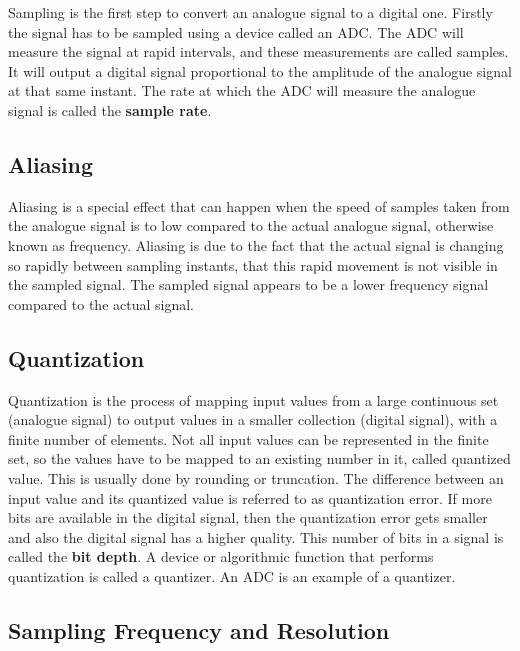 Sampling is the first step to convert an analogue signal to a digital one. Firstly the signal has to be sampled using a device called an \gls{ADC}. The \gls{ADC} will measure the signal at rapid intervals, and these measurements are called samples. It will output a digital signal proportional to the amplitude of the analogue signal at that same instant. The rate at which the \gls{ADC} will measure the analogue signal is called the \textbf{sample rate}.

\subsection{Aliasing}
\label{sub:Aliasing}

Aliasing is a special effect that can happen when the speed of samples taken from the analogue signal is to low compared to the actual analogue signal, otherwise known as frequency. Aliasing is due to the fact that the actual signal is changing so rapidly between sampling instants, that this rapid movement is not visible in the sampled signal. The sampled signal appears to be a lower frequency signal compared to the actual signal.

\subsection{Quantization}
\label{sub:Quantization}

Quantization is the process of mapping input values from a large continuous set (analogue signal) to output values in a smaller collection (digital signal), with a finite number of elements. Not all input values can be represented in the finite set, so the values have to be mapped to an existing number in it, called quantized value. This is usually done by rounding or truncation. The difference between an input value and its quantized value is referred to as quantization error.  If more bits are available in the digital signal, then the quantization error gets smaller and also the digital signal has a higher quality. This number of bits in a signal is called the \textbf{bit depth}. A device or algorithmic function that performs quantization is called a quantizer. An \gls{ADC} is an example of a quantizer. 

\subsection{Sampling Frequency and Resolution}
\label{sub:Sampling-Frequency-Resolution}

